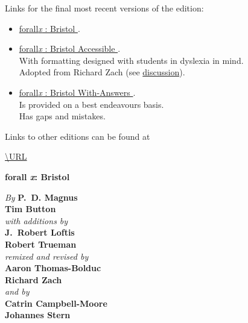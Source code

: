 


\pagestyle{empty}


\newpage
\noindent Links for the \iffinalversion
			final
			\else
			most recent
			\fi
			versions of the \AcademicYearText edition:
\begin{itemize}
	\item \href{\URLforEditionVersions/forallxbris.pdf}{forall\textit{x} : Bristol \AcademicYearText}. 
	\item \href{\URLforEditionVersions/forallxbris-accessible.pdf}{forall\textit{x} : Bristol Accessible \AcademicYearText}. \\With formatting designed with students in dyslexia in mind. \\Adopted from Richard Zach (see \href{https://richardzach.org/2017/11/making-an-accessible-open-logic-textbook-for-dyslexics/}{discussion}).
	\item \href{\URLforEditionVersions/forallxbris-withanswers.pdf}{forall\textit{x} : Bristol With-Answers \AcademicYearText}. \\Is provided on a best endeavours basis. \\Has gaps and mistakes.
\end{itemize}

\bigskip 
\noindent Links to other editions can be found at \begin{center}
	\url{\URL}
\end{center}

\newpage

\vspace*{80pt}



\begin{center}
\fontsize{30pt}{24pt}\sffamily
\selectfont
  \textbf{forall\!
  {\fontsize{37pt}{24pt}\selectfont\rmfamily\textit{x}}: 
  Bristol}
\end{center}


\vfill\noindent
\fontsize{12pt}{16pt}\selectfont \textit{By } \textbf{P.~D. Magnus}\\
\textbf{Tim Button}\\
\textit{with additions by}\\
\textbf{J.~Robert Loftis}\\
\textbf{Robert Trueman}\\
\textit{remixed and revised by}\\
\textbf{Aaron Thomas-Bolduc}\\ \textbf{Richard Zach}\\
\textit{and by}\\
\textbf{Catrin Campbell-Moore}\\ \textbf{Johannes Stern}


